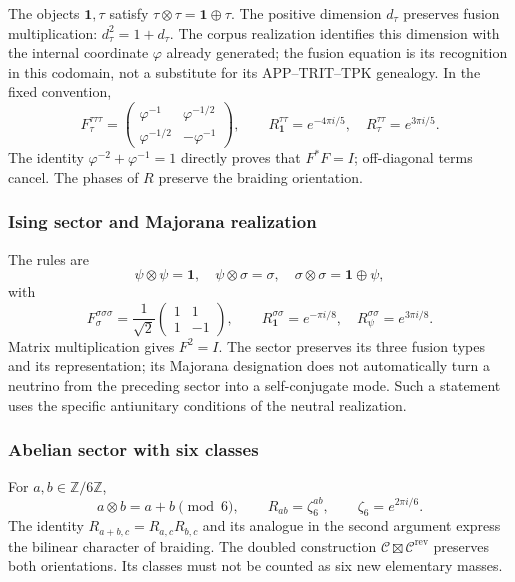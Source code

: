 The objects \(\mathbf1,\tau\) satisfy
\(\tau\otimes\tau=\mathbf1\oplus\tau\). The positive dimension
\(d_\tau\) preserves fusion multiplication:
\(d_\tau^2=1+d_\tau\). The corpus realization identifies this
dimension with the internal coordinate \(\varphi\) already generated; the
fusion equation is its recognition in this codomain, not a
substitute for its APP--TRIT--TPK genealogy. In the fixed convention,
\[
 F_\tau^{\tau\tau\tau}=\begin{pmatrix}
 \varphi^{-1}&\varphi^{-1/2}\\
 \varphi^{-1/2}&-\varphi^{-1}
 \end{pmatrix},\qquad
 R_{\mathbf1}^{\tau\tau}=e^{-4\pi i/5},\quad
 R_\tau^{\tau\tau}=e^{3\pi i/5}.
\]
The identity \(\varphi^{-2}+\varphi^{-1}=1\) directly proves
that \(F^*F=I\); off-diagonal terms cancel. The phases
of \(R\) preserve the braiding orientation.

\subsubsection{Ising sector and Majorana realization}

The rules are
\[
 \psi\otimes\psi=\mathbf1,\quad
 \psi\otimes\sigma=\sigma,\quad
 \sigma\otimes\sigma=\mathbf1\oplus\psi,
\]
with
\[
 F_\sigma^{\sigma\sigma\sigma}=\frac1{\sqrt2}
 \begin{pmatrix}1&1\\1&-1\end{pmatrix},\qquad
 R_{\mathbf1}^{\sigma\sigma}=e^{-\pi i/8},\quad
 R_\psi^{\sigma\sigma}=e^{3\pi i/8}.
\]
Matrix multiplication gives \(F^2=I\). The sector preserves its
three fusion types and its representation; its Majorana designation
does not automatically turn a neutrino from the preceding sector into a
self-conjugate mode. Such a statement uses the specific antiunitary
conditions of the neutral realization.

\subsubsection{Abelian sector with six classes}

For \(a,b\in\mathbb Z/6\mathbb Z\),
\[
 a\otimes b=a+b\pmod6,\qquad
 R_{ab}=\zeta_6^{ab},\qquad\zeta_6=e^{2\pi i/6}.
\]
The identity \(R_{a+b,c}=R_{a,c}R_{b,c}\) and its analogue in the
second argument express the bilinear character of braiding.
The doubled construction
\(\mathcal C\boxtimes\mathcal C^{\mathrm{rev}}\) preserves both
orientations. Its classes must not be counted as six new elementary
masses.

